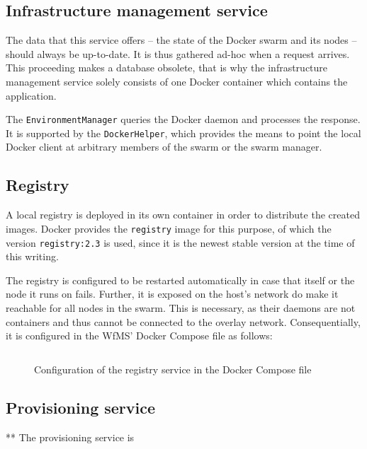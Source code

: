   \subsection{Infrastructure management service} %
    \label{sub:infrastructure_management_service}
      The data that this service offers -- the state of the Docker swarm and its nodes -- should always be up-to-date. It is thus gathered ad-hoc when a request arrives. This proceeding makes a database obsolete, that is why the infrastructure management service solely consists of one Docker container which contains the application.

      The \texttt{EnvironmentManager} queries the Docker daemon and processes the response. It is supported by the \texttt{DockerHelper}, which provides the means to point the local Docker client at arbitrary members of the swarm or the swarm manager.

  \subsection{Registry} %
    \label{sub:registry}
    A local registry is deployed in its own container in order to distribute the created images.
    Docker provides the \texttt{registry} image for this purpose, of which the version \texttt{registry:2.3} is used, since it is the newest stable version at the time of this writing.

    The registry is configured to be restarted automatically in case that itself or the node it runs on fails. Further, it is exposed on the host's network do make it reachable for all nodes in the swarm. This is necessary, as their daemons are not containers and thus cannot be connected to the overlay network. Consequentially, it is configured in the \ac{WfMS}' Docker Compose file as follows:

    \begin{figure}[!htbp]
      \inputminted[firstline=12,lastline=21,fontsize=\footnotesize,linenos=true,numberblanklines=true,showspaces=false,breaklines=true,baselinestretch=1]{yaml}{../code/wfms.yml}
      \caption{Configuration of the registry service in the Docker Compose file}
      \label{fig:configuration_of_the_registry_service_in_the_docker_compose_file}
    \end{figure}

  \subsection{Provisioning service} %
    \label{sub:provisioning_service}
      ** The provisioning service is


